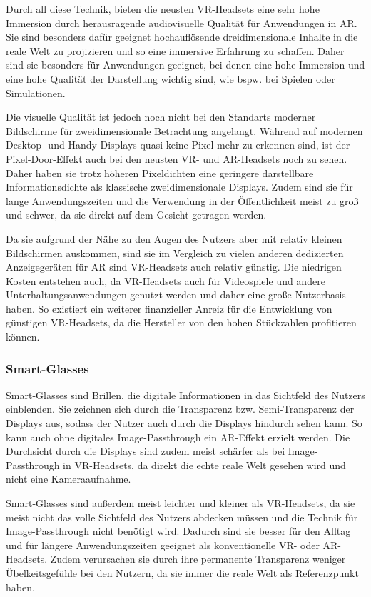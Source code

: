     Durch all diese Technik, bieten die neusten VR-Headsets eine sehr hohe Immersion durch herausragende audiovisuelle Qualität für Anwendungen in AR.
    Sie sind besonders dafür geeignet hochauflösende dreidimensionale Inhalte in die reale Welt zu projizieren und so eine immersive Erfahrung zu schaffen.
    Daher sind sie besonders für Anwendungen geeignet, bei denen eine hohe Immersion und eine hohe Qualität der Darstellung wichtig sind, wie bspw. bei Spielen oder Simulationen.

    Die visuelle Qualität ist jedoch noch nicht bei den Standarts moderner Bildschirme für zweidimensionale Betrachtung angelangt.
    Während auf modernen Desktop- und Handy-Displays quasi keine Pixel mehr zu erkennen sind, ist der Pixel-Door-Effekt auch bei den neusten VR- und AR-Headsets noch zu sehen.
    Daher haben sie trotz höheren Pixeldichten eine geringere darstellbare Informationsdichte als klassische zweidimensionale Displays.
    Zudem sind sie für lange Anwendungszeiten und die Verwendung in der Öffentlichkeit meist zu groß und schwer, da sie direkt auf dem Gesicht getragen werden.

    Da sie aufgrund der Nähe zu den Augen des Nutzers aber mit relativ kleinen Bildschirmen auskommen, sind sie im Vergleich zu vielen anderen dedizierten Anzeigegeräten für AR sind VR-Headsets auch relativ günstig.
    Die niedrigen Kosten entstehen auch, da VR-Headsets auch für Videospiele und andere Unterhaltungsanwendungen genutzt werden und daher eine große Nutzerbasis haben.
    So existiert ein weiterer finanzieller Anreiz für die Entwicklung von günstigen VR-Headsets, da die Hersteller von den hohen Stückzahlen profitieren können.
   

    \subsubsection{Smart-Glasses}

    Smart-Glasses sind Brillen, die digitale Informationen in das Sichtfeld des Nutzers einblenden.
    Sie zeichnen sich durch die Transparenz bzw. Semi-Transparenz der Displays aus, sodass der Nutzer auch durch die Displays hindurch sehen kann.
    So kann auch ohne digitales Image-Passthrough ein AR-Effekt erzielt werden.
    Die Durchsicht durch die Displays sind zudem meist schärfer als bei Image-Passthrough in VR-Headsets, da direkt die echte reale Welt gesehen wird und nicht eine Kameraaufnahme.

    Smart-Glasses sind außerdem meist leichter und kleiner als VR-Headsets, da sie meist nicht das volle Sichtfeld des Nutzers abdecken müssen und die Technik für Image-Passthrough nicht benötigt wird.
    Dadurch sind sie besser für den Alltag und für längere Anwendungszeiten geeignet als konventionelle VR- oder AR-Headsets.
    Zudem verursachen sie durch ihre permanente Transparenz weniger Übelkeitsgefühle bei den Nutzern, da sie immer die reale Welt als Referenzpunkt haben.

